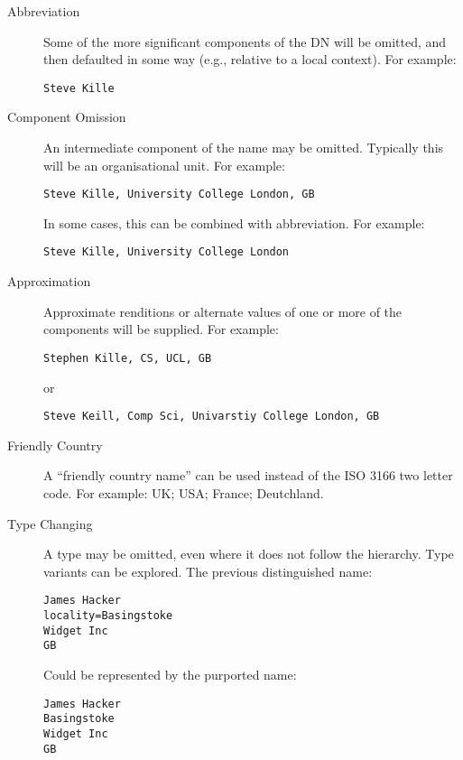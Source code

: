 \begin {description}
\item[Abbreviation] Some of the more significant components of the DN will
be omitted, and then defaulted in some way (e.g., relative to a local
context).  For example:

\begin {verbatim}
Steve Kille
\end{verbatim}

\item[Component Omission]
An intermediate component of the name may be omitted.  Typically this will
be an organisational unit.   For example:

\begin {verbatim}
Steve Kille, University College London, GB
\end{verbatim}


In some cases, this can be combined with abbreviation.  For example:

\begin {verbatim}
Steve Kille, University College London
\end{verbatim}

\item[Approximation] Approximate renditions or alternate values
of one or more of the components
will be supplied. For example:

\begin {verbatim}
Stephen Kille, CS, UCL, GB   
\end{verbatim}

or

\begin{verbatim}
Steve Keill, Comp Sci, Univarstiy College London, GB
\end{verbatim}


\item[Friendly Country] A ``friendly country name'' can be used instead of
the ISO 3166 two letter code.  For example: UK; USA; France; Deutchland.  

\item[Type Changing] A type may be omitted, even where it does not follow
the hierarchy.   Type variants can be explored.
The previous distinguished name:
\begin {verbatim}
James Hacker 
locality=Basingstoke 
Widget Inc 
GB 
\end{verbatim}

Could be represented by the purported name:

\begin {verbatim}
James Hacker 
Basingstoke 
Widget Inc 
GB 
\end{verbatim}


\end {description}



